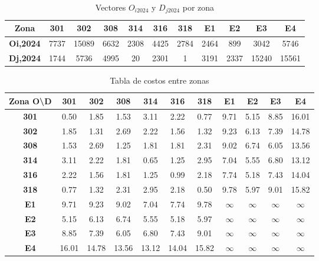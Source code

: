 \documentclass[letterpaper,12pt]{article}
\begin{document}
    
\begin{table}[h!]
    \centering
    \begin{tabular}{c|cccccccccc}
    
    \textbf{Zona} & \textbf{301} & \textbf{302} & \textbf{308} & \textbf{314} & \textbf{316} & \textbf{318} & \textbf{E1} & \textbf{E2} & \textbf{E3} & \textbf{E4} \\ \hline
    \textbf{Oi,2024} & 7737 & 15089 & 6632 & 2308 & 4425 & 2784 & 2464 & 899 & 3042 & 5746 \\ 
    \textbf{Dj,2024} & 1744 & 5736 & 4995 & 20 & 2301 & 1 & 3191 & 2337 & 15240 & 15561 \\ 
    \end{tabular}
    \caption{Vectores $O_{i2024}$ y $D_{j2024}$ por zona}
    \label{table:oi_dj_2024}
\end{table}


\begin{table}[h!]
    \centering
    \begin{tabular}{c|cccccccccc}
    
    \textbf{Zona O\textbackslash D} & \textbf{301} & \textbf{302} & \textbf{308} & \textbf{314} & \textbf{316} & \textbf{318} & \textbf{E1} & \textbf{E2} & \textbf{E3} & \textbf{E4} \\ \hline
    \textbf{301} & 0.50 & 1.85 & 1.53 & 3.11 & 2.22 & 0.77 & 9.71 & 5.15 & 8.85 & 16.01 \\ 
    \textbf{302} & 1.85 & 1.31 & 2.69 & 2.22 & 1.56 & 1.32 & 9.23 & 6.13 & 7.39 & 14.78 \\ 
    \textbf{308} & 1.53 & 2.69 & 1.25 & 1.81 & 1.81 & 2.31 & 9.02 & 6.74 & 6.05 & 13.56 \\ 
    \textbf{314} & 3.11 & 2.22 & 1.81 & 0.65 & 1.25 & 2.95 & 7.04 & 5.55 & 6.80 & 13.12 \\ 
    \textbf{316} & 2.22 & 1.56 & 1.81 & 1.25 & 0.99 & 2.18 & 7.74 & 5.18 & 7.43 & 14.04 \\ 
    \textbf{318} & 0.77 & 1.32 & 2.31 & 2.95 & 2.18 & 0.50 & 9.78 & 5.97 & 9.01 & 15.82 \\ 
    \textbf{E1} & 9.71 & 9.23 & 9.02 & 7.04 & 7.74 & 9.78 & $\infty$ & $\infty$ & $\infty$ & $\infty$ \\ 
    \textbf{E2} & 5.15 & 6.13 & 6.74 & 5.55 & 5.18 & 5.97 & $\infty$ & $\infty$ & $\infty$ & $\infty$ \\ 
    \textbf{E3} & 8.85 & 7.39 & 6.05 & 6.80 & 7.43 & 9.01 & $\infty$ & $\infty$ & $\infty$ & $\infty$ \\ 
    \textbf{E4} & 16.01 & 14.78 & 13.56 & 13.12 & 14.04 & 15.82 & $\infty$ & $\infty$ & $\infty$ & $\infty$ \\ 
    \end{tabular}
    \caption{Tabla de costos entre zonas}
    \label{table:costs_zones}
\end{table}
    
\end{document}

